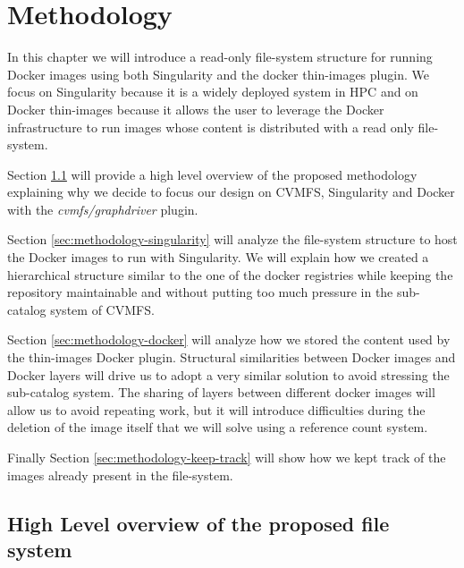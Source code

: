 \chapter{Methodology}\label{ch:Methodology}

In this chapter we will introduce a read-only file-system structure for
running Docker images using both Singularity and the docker thin-images plugin.
We focus on Singularity because it is a widely deployed system in HPC and on
Docker thin-images because it allows the user to leverage the Docker infrastructure
to run images whose content is distributed with a read only file-system.

Section \ref{sec:methodology-high-level} will provide a high level overview of
the proposed methodology explaining why we decide to focus our design on CVMFS,
Singularity and Docker with the \textit{cvmfs/graphdriver} plugin.

Section \ref{sec:methodology-singularity} will analyze the file-system
structure to host the Docker images to run with Singularity. We will explain
how we created a hierarchical structure similar to the one of the docker
registries while keeping the repository maintainable and without putting too
much pressure in the sub-catalog system of CVMFS.

Section \ref{sec:methodology-docker} will analyze how we stored the content used
by the thin-images Docker plugin. Structural similarities between Docker images
and Docker layers will drive us to adopt a very similar solution to avoid
stressing the sub-catalog system. The sharing of layers between different
docker images will allow us to avoid repeating work, but it will introduce
difficulties during the deletion of the image itself that we will solve using a
reference count system.

Finally Section \ref{sec:methodology-keep-track} will show how we kept
track of the images already present in the file-system.

\section{High Level overview of the proposed file system}
\label{sec:methodology-high-level}

